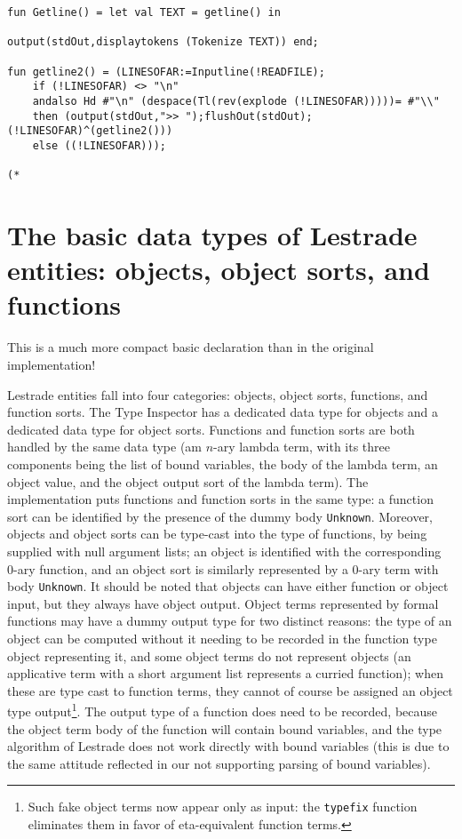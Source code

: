 \documentclass[12pt]{article}
\begin{document}
\begin{verbatim}
fun Getline() = let val TEXT = getline() in

output(stdOut,displaytokens (Tokenize TEXT)) end;

fun getline2() = (LINESOFAR:=Inputline(!READFILE);
    if (!LINESOFAR) <> "\n"
	andalso Hd #"\n" (despace(Tl(rev(explode (!LINESOFAR)))))= #"\\"
	then (output(stdOut,">> ");flushOut(stdOut);(!LINESOFAR)^(getline2()))
	else ((!LINESOFAR)));

(*

\end{verbatim}

\newpage

\section{The basic data types of Lestrade entities:   objects, object sorts, and functions}

This is a much more compact basic declaration than in the original implementation!

Lestrade entities fall into four categories:  objects, object sorts, functions, and function sorts.  The Type Inspector has a dedicated data type for objects and a dedicated data type for object sorts.
Functions and function sorts are both handled by the same data type (am $n$-ary lambda term, with its three components being the list of bound variables, the body of the lambda term, an object value, and the object output sort of the lambda term).  The implementation puts functions and function sorts in the same type:  a function sort can be identified by the presence of the dummy body
{\tt Unknown}.  Moreover, objects and object sorts can be type-cast into the type of functions, by being supplied with null argument lists;  an object is identified with the corresponding 0-ary function, and an object sort is similarly represented by a 0-ary term with body {\tt Unknown}.  It should be noted that objects can have either function or object input, but they always have
object output.  Object terms represented by formal functions may have a dummy output type for two distinct reasons:  the type of an object can be computed without it needing
to be recorded in the function type object representing it, and some object terms do not represent objects (an applicative term with a short argument list represents a curried function);
when these are type cast to function terms, they cannot of course be assigned an object type output\footnote{Such fake object terms now appear only as input:  the {\tt typefix} function eliminates them in favor of eta-equivalent function terms.}.   The output type of a function does need to be recorded, because the object term body of the function will contain bound variables, and the type algorithm of Lestrade does not work directly with bound variables (this is due to the same attitude reflected in our not supporting parsing of bound variables).
\end{document}
